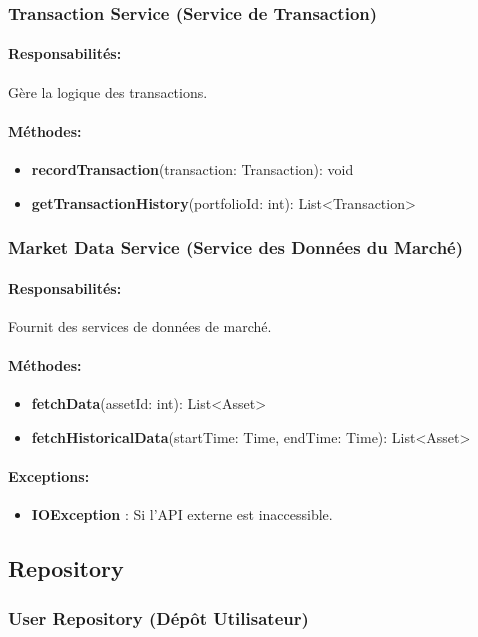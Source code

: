 \documentclass{article}
\begin{document}
\subsubsection{Transaction Service (Service de Transaction)}
\paragraph{Responsabilités:} Gère la logique des transactions.
\paragraph{Méthodes:}
\begin{itemize}
  \item \textbf{recordTransaction}(transaction: Transaction): void
  \item \textbf{getTransactionHistory}(portfolioId: int): List<Transaction>
\end{itemize}
\subsubsection{Market Data Service (Service des Données du Marché)}
\paragraph{Responsabilités:} Fournit des services de données de marché.
\paragraph{Méthodes:}
\begin{itemize}
  \item \textbf{fetchData}(assetId: int): List<Asset>
  \item \textbf{fetchHistoricalData}(startTime: Time, endTime: Time): List<Asset>
\end{itemize}
\paragraph{Exceptions:}
\begin{itemize}
  \item \textbf{IOException} : Si l'API externe est inaccessible.
\end{itemize}
\subsection{Repository}
\subsubsection{User Repository (Dépôt Utilisateur)}
\end{document}
